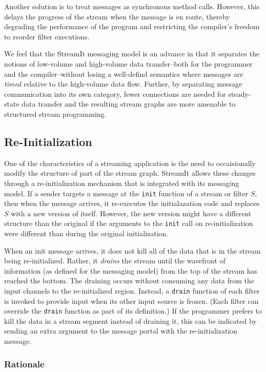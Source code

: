 Another solution is to treat messages as synchronous method calls.
However, this delays the progress of the stream when the message is en
route, thereby degrading the performance of the program and
restricting the compiler's freedom to reorder filter executions.  

We feel that the StreamIt messaging model is an advance in that it
separates the notions of low-volume and high-volume data
transfer--both for the programmer and the compiler--without losing a
well-defind semantics where messages are {\it timed} relative to the
high-volume data flow.  Further, by separating message communication
into its own category, fewer connections are needed for steady-state
data transfer and the resulting stream graphs are more amenable to
structured stream programming.

\subsection{Re-Initialization}
\label{sec:reinit}

One of the characteristics of a streaming application is the need to
occaisionally modify the structure of part of the stream graph.
StreamIt allows these changes through a re-initialization mechanism
that is integrated with its messaging model.  If a sender targets a
message at the {\tt init} function of a stream or filter $S$, then
when the message arrives, it re-executes the initialazation code and
replaces $S$ with a new version of itself.  However, the new version
might have a different structure than the original if the arguments to
the {\tt init} call on re-initialization were different than during
the original initialization.

When an init message arrives, it does not kill all of the data that is
in the stream being re-initialized.  Rather, it {\it drains} the
stream until the wavefront of information (as defined for the
messaging model) from the top of the stream has reached the bottom.
The draining occurs without consuming any data from the input channels
to the re-initialized region.  Instead, a {\tt drain} function of each
filter is invoked to provide input when its other input source is
frozen.  (Each filter can override the {\tt drain} function as part of
its definition.)  If the programmer prefers to kill the data in a
stream segment instead of draining it, this can be indicated by
sending an extra argument to the message portal with the
re-initialization message.

\subsubsection{Rationale}

